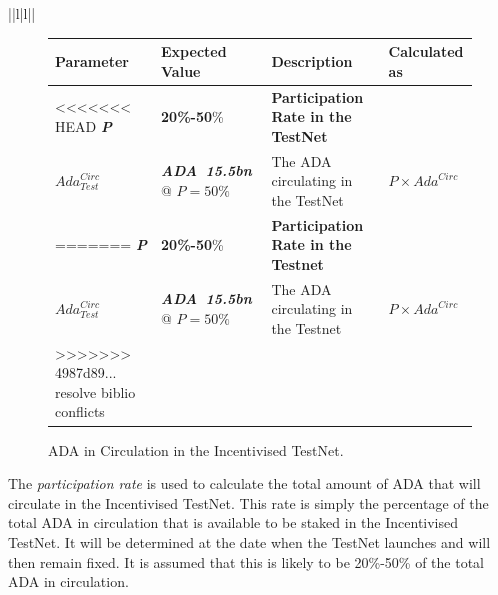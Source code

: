 \documentclass[11pt,a4paper,dvipsnames,twosided,final]{article}
\newcommand{\khcomment}[1]{\todo[color=blue!20]{KH: #1}}
\newcommand{\ada}{ADA{}}
\newcommand{\ADA}[1]{\textbf{\emph{\ada~{#1}}}}
\begin{document}
\begin{tabular}{||l|l||}
\begin{figure}[h!]
\begin{center}
\begin{tabular}{||l|l|p{6cm}|l||}
  \hline \hline
\textbf{Parameter} & \textbf{Expected Value} & \textbf{Description} & \textbf{Calculated as} \\\hline
<<<<<<< HEAD
\textbf{\color{blue} \emph{P}} & \textbf{\color{blue} 20\%-50}\% & \textbf{\color{blue} Participation Rate in the TestNet} & \\\hline
$\textit{Ada}^{\textit{Circ}}_{\textit{Test}}$ & \ADA{15.5bn} @ $P=50\%$ & The \ada{} circulating in the TestNet & $P \times \textit{Ada}^{\textit{Circ}}$ \\\hline
=======
\textbf{\color{blue} \emph{P}} & \textbf{\color{blue} 20\%-50}\% & \textbf{\color{blue} Participation Rate in the Testnet} & \\\hline
$\textit{Ada}^{\textit{Circ}}_{\textit{Test}}$ & \ADA{15.5bn} @ $P=50\%$ & The \ada{} circulating in the Testnet & $P \times \textit{Ada}^{\textit{Circ}}$ \\\hline
>>>>>>> 4987d89... resolve biblio conflicts
  \hline
\end{tabular}
\end{center}
\caption{\ada{} in Circulation in the Incentivised TestNet.}
\end{figure}

\noindent
The \emph{participation rate} is used to calculate the total amount of \ada{} that will circulate in the Incentivised TestNet.
This rate is simply the percentage of the total \ada{} in  circulation that is available to be staked in the Incentivised TestNet.
It will be determined at the date when the
TestNet launches and will then remain fixed.
It is assumed that this is likely to be 20\%-50\% of the total \ada{} in circulation.



\end{tabular}
\end{document}
